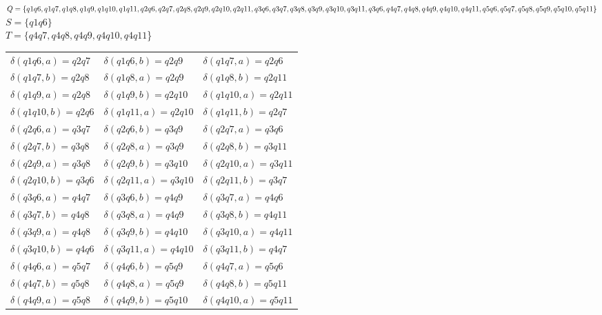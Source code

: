 \documentclass[a4paper, 12pt]{article}
\begin{document}
\begin{enumerate}
  
    $Q = \{q1q6, q1q7, q1q8, q1q9, q1q10, q1q11,
             q2q6, q2q7, q2q8, q2q9, q2q10, q2q11,\\
             q3q6, q3q7, q3q8, q3q9, q3q10, q3q11,
             q3q6, q4q7, q4q8, q4q9, q4q10, q4q11,
             q5q6, \\ q5q7, q5q8, q5q9, q5q10, q5q11\}$ \\
    $S = \{q1q6\}$ \\
    $T = \{q4q7, q4q8, q4q9, q4q10, q4q11$\} \\
    \begin{tabular} {l l l}
        $\delta (q1q6, a) = q2q7 $ & $\delta (q1q6, b) =  q2q9$ & $\delta (q1q7, a) = q2q6$\\ 
        $\delta (q1q7, b) =q2q8 $ & $\delta (q1q8, a) = q2q9$ & $\delta (q1q8, b) = q2q11 $\\ $\delta (q1q9, a) =q2q8  $ & $\delta (q1q9, b) = q2q10$ & $\delta (q1q10, a) = q2q11$\\ 
        $\delta (q1q10, b) = q2q6$ & $\delta (q1q11, a) = q2q10$ & $\delta (q1q11, b) = q2q7 $\\ 
        $\delta (q2q6, a) = q3q7 $ & $\delta (q2q6, b) = q3q9  $ & $\delta (q2q7, a) = q3q6 $\\ 
        $\delta (q2q7, b) = q3q8 $ & $\delta (q2q8, a) = q3q9 $ & $\delta (q2q8, b) =  q3q11 $\\ $\delta (q2q9, a) =  q3q8 $ & $\delta (q2q9, b) = q3q10 $ & $\delta (q2q10, a) = q3q11 $\\ 
        $\delta (q2q10, b) = q3q6 $ & $\delta (q2q11, a) = q3q10 $ & $\delta (q2q11, b) = q3q7 $\\ 
        $\delta (q3q6, a) = q4q7 $ & $\delta (q3q6, b) = q4q9  $ & $\delta (q3q7, a) = q4q6 $\\ 
        $\delta (q3q7, b) = q4q8 $ & $\delta (q3q8, a) = q4q9 $ & $\delta (q3q8, b) =  q4q11 $\\ $\delta (q3q9, a) =  q4q8 $ & $\delta (q3q9, b) = q4q10 $ & $\delta (q3q10, a) = q4q11 $\\ 
        $\delta (q3q10, b) = q4q6 $ & $\delta (q3q11, a) = q4q10 $ & $\delta (q3q11, b) = q4q7 $\\ 
        $\delta (q4q6, a) = q5q7 $ & $\delta (q4q6, b) = q5q9  $ & $\delta (q4q7, a) = q5q6 $\\ 
        $\delta (q4q7, b) = q5q8 $ & $\delta (q4q8, a) = q5q9 $ & $\delta (q4q8, b) =  q5q11 $\\ $\delta (q4q9, a) =  q5q8 $ & $\delta (q4q9, b) = q5q10 $ & $\delta (q4q10, a) = q5q11 $\\ 

\end{tabular}
\end{enumerate}
\end{document}
